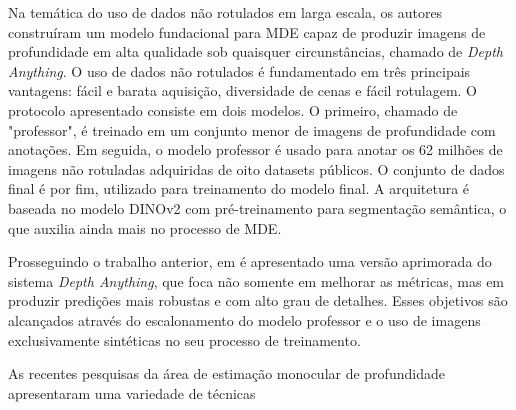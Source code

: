Na temática do uso de dados não rotulados em larga escala, os autores  construíram um modelo fundacional para MDE capaz de produzir imagens de profundidade em alta qualidade sob quaisquer circunstâncias, chamado de \textit{Depth Anything}. O uso de dados não rotulados é fundamentado em três principais vantagens: fácil e barata aquisição, diversidade de cenas e fácil rotulagem. O protocolo apresentado consiste em dois modelos. O primeiro, chamado de "professor", é treinado em um conjunto menor de imagens de profundidade com anotações. Em seguida, o modelo professor é usado para anotar os 62 milhões de imagens não rotuladas adquiridas de oito datasets públicos. O conjunto de dados final é por fim, utilizado para treinamento do modelo final. A arquitetura é baseada no modelo DINOv2 com pré-treinamento para segmentação semântica, o que auxilia ainda mais no processo de MDE.

Prosseguindo o trabalho anterior, em \cite{yang2024depth} é apresentado uma versão aprimorada do sistema \textit{Depth Anything}, que foca não somente em melhorar as métricas, mas em produzir predições mais robustas e com alto grau de detalhes. Esses objetivos são alcançados através do escalonamento do modelo professor e o uso de imagens exclusivamente sintéticas no seu processo de treinamento. 


As recentes pesquisas da área de estimação monocular de profundidade apresentaram uma variedade de técnicas